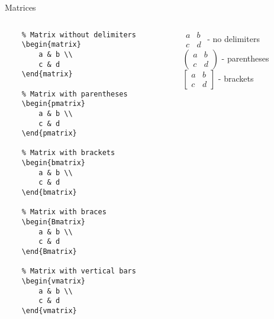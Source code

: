 \begin{frame}[fragile]{Matrices}
    \begin{columns}
        \begin{column}{0.5\textwidth}
\begin{lstlisting}
    % Matrix without delimiters
    \begin{matrix}
        a & b \\
        c & d
    \end{matrix}
    
    % Matrix with parentheses
    \begin{pmatrix}
        a & b \\
        c & d
    \end{pmatrix}
    
    % Matrix with brackets
    \begin{bmatrix}
        a & b \\
        c & d
    \end{bmatrix}
    
    % Matrix with braces
    \begin{Bmatrix}
        a & b \\
        c & d
    \end{Bmatrix}
    
    % Matrix with vertical bars
    \begin{vmatrix}
        a & b \\
        c & d
    \end{vmatrix}
\end{lstlisting}
        \end{column}
        
        \begin{column}{0.5\textwidth}
            \begin{center}
                $\begin{matrix} a & b \\ c & d \end{matrix}$ - no delimiters\\[10pt]
                
                $\begin{pmatrix} a & b \\ c & d \end{pmatrix}$ - parentheses\\[10pt]
                
                $\begin{bmatrix} a & b \\ c & d \end{bmatrix}$ - brackets\\[10pt]
                

\end{center}
\end{column}
\end{columns}
\end{frame}

